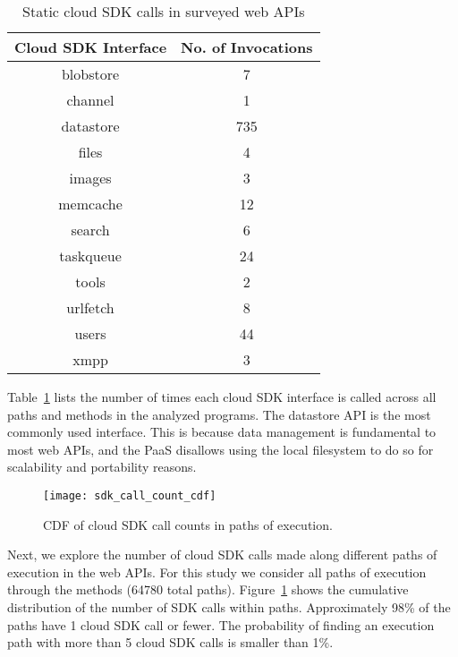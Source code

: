 \begin{table}
\caption{Static cloud SDK calls in surveyed web APIs
\label{tab:sdk_call_counts}
}
\begin{center}
\begin{tabular}{|c|c|}
\hline
Cloud SDK Interface & No. of Invocations \\ \hline
blobstore & 7 \\ \hline
channel & 1 \\ \hline
datastore & 735 \\ \hline
files & 4 \\ \hline
images & 3 \\ \hline
memcache & 12 \\ \hline
search & 6 \\ \hline
taskqueue & 24 \\ \hline
tools & 2 \\ \hline
urlfetch & 8 \\ \hline
users & 44 \\ \hline
xmpp & 3 \\ \hline
\end{tabular}
\end{center}
\end{table}

Table~\ref{tab:sdk_call_counts} lists the number of times each cloud 
SDK interface is called across all paths and methods in the analyzed programs.
The datastore API is the most commonly used interface.
This is because data management is fundamental 
to most web APIs, and the PaaS
disallows using the local filesystem to do so
for scalability and portability reasons.

\begin{figure}
\centering
\texttt{[image: sdk\_call\_count\_cdf]}
\caption{CDF of cloud SDK call counts in paths of execution.
\label{fig:sdk_call_count_cdf}
}
\end{figure}

Next, we explore the number of cloud SDK calls made along 
different paths of execution in the web APIs. For this study
we consider all paths of execution through the methods (64780 total paths). 
Figure~\ref{fig:sdk_call_count_cdf}
shows the cumulative distribution of the number of SDK calls within paths.
Approximately 98\% of the paths have 1 cloud SDK call or fewer. 
The probability of finding an execution path with more than
5 cloud SDK calls is smaller than 1\%.

